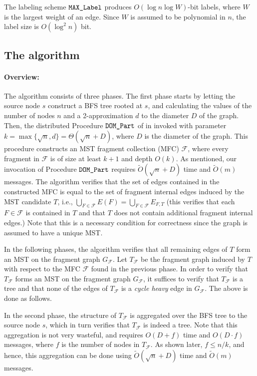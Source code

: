 \documentclass[11pt,letter]{article}
\def\DOM{\mbox{\tt DOM\_Part}}
\def\LAB{\mbox{\tt MAX\_Label}}
\def\cF{\mathcal{F}}
\begin{document}
The labeling scheme  $\LAB$  produces $O(\log n \log W)$-bit labels, 
where $W$ is the largest weight of an edge. Since $W$ is assumed to be 
polynomial in $n$, the label size is $O(\log ^2 n)$ bit.

\subsection{The algorithm}

\paragraph{Overview:} The algorithm consists of three  phases. The first phase  starts by letting the source node $s$ construct a BFS tree rooted at $s$, and calculating the values of the number of nodes $n$ and a 2-approximation $d$ to the diameter $D$ of the graph. Then, the distributed 
Procedure $\DOM$ of \cite{KP_98} in invoked with parameter $k=\max \{\sqrt n,d\}=\Theta(\sqrt n+D)$, where $D$ is the diameter of the graph. This procedure constructs an MST fragment collection 
(MFC) $\cF$, where every fragment in $\cF$
is of size at least $k+1$ and depth $O(k)$. As mentioned, our invocation of Procedure $\DOM$ requires $\tilde{O}(\sqrt{n}+D)$ time and 
$\tilde{O}(m)$ messages.
The algorithm verifies that the set of edges contained in the constructed MFC 
is equal to the set of fragment internal edges induced by the MST candidate $T$, i.e., 
$\bigcup_{F\in \cF} E(F) = \bigcup_{F\in \cF} E_{F,T}$ 
(this verifies that each $F\in \cF$ is contained in $T$ and that  $T$ does not contain additional fragment internal edges.)
Note that this is a necessary  condition for correctness since the graph is assumed to have  a unique MST. 

In the following phases, the algorithm verifies that all remaining edges of $T$  form an MST on the fragment graph $G_{\cF}$. Let $T_{\cF}$ be the fragment 
graph induced by $T$ with respect to the MFC $\cF$ found in the previous phase.
In order to verify that $T_{\cF}$ forms an MST on the 
fragment graph $G_{\cF}$, it suffices to verify that $T_{\cF}$ is a tree and 
that none of the edges of $T_{\cF}$ is  a {\em cycle heavy} edge in  $G_{\cF}$.
The above is done as follows. 

In the second phase, the structure of  $T_{\cF}$ is aggregated over the BFS tree to the source node $s$, which in turn verifies that
 $T_{\cF}$ is indeed a tree. Note that this aggregation is not very wasteful, and requires $O(D+f)$ time and $O(D\cdot f)$ messages, where $f$ is the number of nodes in $T_{\cF}$. As shown later, $f \le n/k$, and hence, this aggregation can be done using $\tilde{O}(\sqrt{n}+D)$ time and 
$\tilde{O}(m)$ messages.
\end{document}
